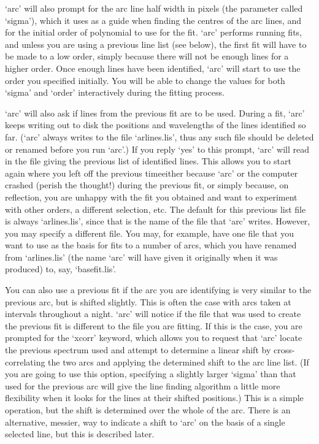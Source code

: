    `arc' will also prompt for the arc line half width in pixels (the
   parameter called `sigma'), which it uses as a guide when finding the
   centres of the arc lines, and for the initial order of polynomial to
   use for the fit. `arc' performs running fits, and unless you are
   using a previous line list (see below), the first fit will have to be
   made to a low order, simply because there will not be enough lines
   for a higher order.  Once enough lines have been identified, `arc'
   will start to use the order you specified initially.  You will be
   able to change the values for both `sigma' and `order' interactively
   during the fitting process.

   `arc' will also ask if lines from the previous fit are to be used.
   During a fit, `arc' keeps writing out to disk the positions and
   wavelengths of the lines identified so far. (`arc' always writes to
   the file `arlines.lis', thus any such file should be deleted or
   renamed before you run `arc'.)  If you reply `yes' to this prompt,
   `arc' will read in the file giving the previous list of identified
   lines.  This allows you to start again where you left off the
   previous time\latorhtm{---}{-}either because `arc' or the computer
   crashed (perish
   the thought!) during the previous fit, or simply because, on
   reflection, you are unhappy with the fit you obtained and want to
   experiment with other orders, a different selection, etc.  The
   default for this previous list file is always `arlines.lis', since
   that is the name of the file that `arc' writes.  However, you may
   specify a different file.  You may, for example, have one file that
   you want to use as the basis for fits to a number of arcs, which you
   have renamed from `arlines.lis' (the name `arc' will have given it
   originally when it was produced) to, say, `basefit.lis'.

   You can also use a previous fit if the arc you are identifying is
   very similar to the previous arc, but is shifted slightly. This is
   often the case with arcs taken at intervals throughout a night. `arc'
   will notice if the file that was used to create the previous fit is
   different to the file you are fitting.  If this is the case, you are
   prompted for the `xcorr' keyword, which allows you to request that
   `arc' locate the previous spectrum used and attempt to determine a
   linear shift by cross-correlating the two arcs and applying the
   determined shift to the arc line list.  (If you are going to use this
   option, specifying a slightly larger `sigma' than that used for the
   previous arc will give the line finding algorithm a little more
   flexibility when it looks for the lines at their shifted positions.)
   This is a simple operation, but the shift is determined over the
   whole of the arc.  There is an alternative, messier, way to indicate
   a shift to `arc' on the basis of a single selected line, but this is
   described later.

